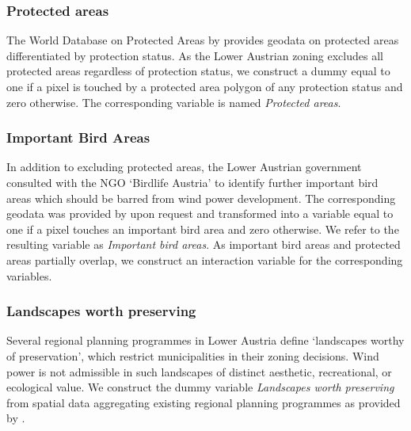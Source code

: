 \documentclass[review, a4paper, 12pt, authoryear, times]{elsarticle}
\begin{document}
\subsubsection{Protected areas}
The World Database on Protected Areas by \cite{WDPA2023} provides geodata on protected areas differentiated by protection status. 
As the Lower Austrian zoning excludes all protected areas regardless of protection status, we construct a dummy equal to one if a pixel is touched by a protected area polygon of any protection status and zero otherwise.
The corresponding variable is named \emph{Protected areas}.

\subsubsection{Important Bird Areas}
In addition to excluding protected areas, the Lower Austrian government consulted with the NGO `Birdlife Austria' to identify further important bird areas which should be barred from wind power development.
The corresponding geodata was provided by \cite{BirdLife} upon request and transformed into a variable equal to one if a pixel touches an important bird area and zero otherwise. 
We refer to the resulting variable as \emph{Important bird areas}.
As important bird areas and protected areas partially overlap, we construct an interaction variable for the corresponding variables.

\subsubsection{Landscapes worth preserving}
Several regional planning programmes in Lower Austria define `landscapes worthy of preservation', which restrict municipalities in their zoning decisions. 
Wind power is not admissible in such landscapes of distinct aesthetic, recreational, or ecological value. 
We construct the dummy variable \emph{Landscapes worth preserving} from spatial data aggregating existing regional planning programmes as provided by \cite{LandNiederoesterreich2015}.
\end{document}
